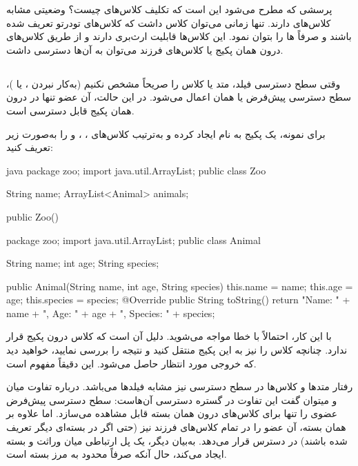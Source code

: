 پرسشی که مطرح می‌شود این است که تکلیف کلاس‌های 
چیست؟ وضعیتی مشابه کلاس‌های  دارند. تنها زمانی
می‌توان کلاس  داشت که کلاس‌های تودرتو تعریف شده
باشند و صرفاً  ها را بتوان  نمود.
این کلاس‌ها قابلیت ارث‌بری دارند و از طریق کلاس‌های درون همان پکیج یا
کلاس‌های فرزند می‌توان به آن‌ها دسترسی داشت.

\subsection{}

وقتی سطح دسترسی فیلد، متد یا کلاس را صریحاً مشخص نکنیم (به‌کار نبردن
،  یا 
)، سطح دسترسی پیش‌فرض  یا همان 
اعمال می‌شود. در این حالت، آن عضو تنها در درون همان پکیج قابل دسترسی است.

برای نمونه، یک پکیج به نام  ایجاد کرده و به‌ترتیب
کلاس‌های  ،  ،  و
 را به‌صورت زیر تعریف کنید:

\begin{codebox}{java}
package zoo;
import java.util.ArrayList;
public class Zoo {
     String name;
     ArrayList<Animal> animals;

    public Zoo(){
    }
}

package zoo;
import java.util.ArrayList;
public class Animal {
     String name;
     int age;
     String species;

    public Animal(String name, int age, String species) {
        this.name = name;
        this.age = age;
        this.species = species;
    }
    @Override
    public String toString() {
        return "Name: " + name + ", Age: " + age + ", Species: " + species;
    }
}
\end{codebox}

با این کار، احتمالاً با خطا مواجه می‌شوید. دلیل آن است که کلاس
 درون پکیج  قرار ندارد. چنانچه کلاس
 را نیز به این پکیج منتقل کنید و نتیجه را بررسی
نمایید، خواهید دید که خروجی مورد انتظار حاصل می‌شود. این دقیقاً مفهوم
 است.

رفتار متدها و کلاس‌ها در سطح دسترسی  نیز مشابه فیلدها
می‌باشد. درباره تفاوت میان  و  میتوان
گفت این تفاوت در گستره دسترسی آن‌هاست: سطح دسترسی پیش‌فرض
 عضوی را تنها برای کلاس‌های درون همان بسته قابل
مشاهده می‌سازد. اما  علاوه بر همان بسته، آن عضو را در تمام
کلاس‌های فرزند نیز (حتی اگر در بسته‌ای دیگر تعریف شده باشند) در دسترس قرار
می‌دهد. به‌بیان دیگر،  یک پل ارتباطی میان وراثت و بسته ایجاد
می‌کند، حال آنکه  صرفاً محدود به مرز بسته است.

